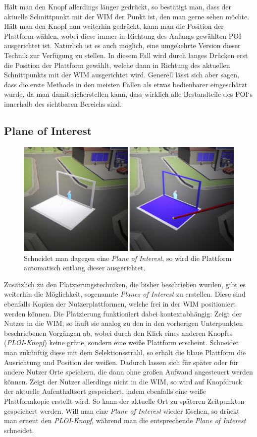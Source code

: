 Hält man den Knopf allerdings länger gedrückt, so bestätigt man, dass der aktuelle Schnittpunkt mit der WIM der Punkt ist, den man gerne sehen möchte. Hält man den Knopf nun weiterhin gedrückt, kann man die Position der Plattform wählen, wobei diese immer in Richtung des Anfangs gewählten POI ausgerichtet ist.
Natürlich ist es auch möglich, eine umgekehrte Version dieser Technik zur Verfügung zu stellen. In diesem Fall wird durch langes Drücken erst die Position der Plattform gewählt, welche dann in Richtung des aktuellen Schnittpunkts mit der WIM ausgerichtet wird. 
Generell lässt sich aber sagen, dass die erste Methode in den meisten Fällen als etwas bedienbarer eingeschätzt wurde, da man damit sicherstellen kann, dass wirklich alle Bestandteile des POI`s innerhalb des sichtbaren Bereichs sind.

\subsection{Plane of Interest}

\begin{figure}[h!]
  \centering
  \includegraphics[width=\textwidth]{images/platform_bluewhite.JPG}
  \caption{Schneidet man dagegen eine \textit{Plane of Interest}, so wird die Plattform automatisch entlang dieser ausgerichtet.}
  \label{fig:todo}
\end{figure}

Zusätzlich zu den Platzierungstechniken, die bisher beschrieben wurden, gibt es weiterhin die Möglichkeit, sogenannte \textit{Planes of Interest} zu erstellen. Diese sind ebenfalls Kopien der Nutzerplattformen, welche frei in der WIM positioniert werden können. Die Platzierung funktioniert dabei kontextabhängig:
Zeigt der Nutzer in die WIM, so läuft sie analog zu den in den vorherigen Unterpunkten beschriebenen Vorgängen ab, wobei durch den Klick eines anderen Knopfes (\textit{PLOI-Knopf}) keine grüne, sondern eine weiße Plattform erscheint. Schneidet man zukünftig diese mit dem Selektionsstrahl, so erhält die blaue Plattform die Ausrichtung und Position der weißen. Dadurch lassen sich für später oder für andere Nutzer Orte speichern, die dann ohne großen Aufwand angesteuert werden können.
Zeigt der Nutzer allerdings nicht in die WIM, so wird auf Knopfdruck der aktuelle Aufenthaltsort gespeichert, indem ebenfalls eine weiße Plattformkopie erstellt wird. So kann der aktuelle Ort zu späteren Zeitpunkten gespeichert werden.
Will man eine \textit{Plane of Interest} wieder löschen, so drückt man erneut den \textit{PLOI-Knopf}, während man die entsprechende \textit{Plane of Interest} schneidet.


